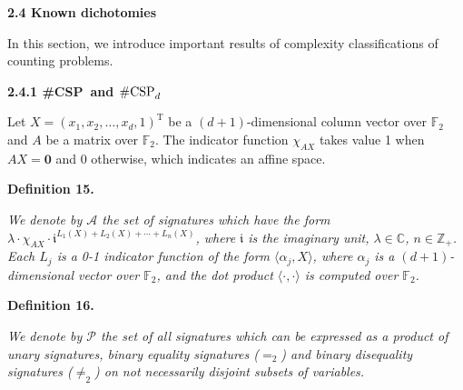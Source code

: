 




\par\medskip\noindent\textbf{
2.4 Known dichotomies}\par




In this section, we introduce important results of complexity classifications of counting problems.\par




\par\medskip\noindent\textbf{
2.4.1 \#CSP and $\textup{{\#CSP}}_{d}$
}\par




Let $X=(x_{1},x_{2},\ldots,x_{d},1)^{\mathrm{T}}$ be a $(d+1)$-dimensional column vector over $\mathbb{F}_{2}$ and $A$ be a matrix over $\mathbb{F}_{2}$. The indicator function $\chi_{AX}$ takes value 1 when $AX=\mathbf{0}$ and 0 otherwise, which indicates an affine space.\par





\par\medskip\noindent\textbf{
\textbf{Definition 15}\textbf{.}
}\par



\emph{We denote by $\mathscr{A}$ the set of signatures which have the form $\lambda\cdot\chi_{AX}\cdot\mathfrak{i}^{L_{1}(X)+L_{2}(X)+\cdots+L_{n}(X)}$, where $\mathfrak{i}$ is the imaginary unit, $\lambda\in\mathbb{C}$, $n\in\mathbb{Z}_{+}$. Each $L_{j}$ is a 0-1 indicator function of the form $\langle\alpha_{j},X\rangle$, where $\alpha_{j}$ is a $(d+1)$-dimensional vector over $\mathbb{F}_{2}$, and the dot product $\langle\cdot,\cdot\rangle$ is computed over $\mathbb{F}_{2}$.}\par







\par\medskip\noindent\textbf{
\textbf{Definition 16}\textbf{.}
}\par



\emph{We denote by $\mathscr{P}$ the set of all signatures which can be expressed as a product of unary signatures, binary equality signatures ($=_{2}$) and binary disequality signatures ($\neq_{2}$) on not necessarily disjoint subsets of variables.}\par



